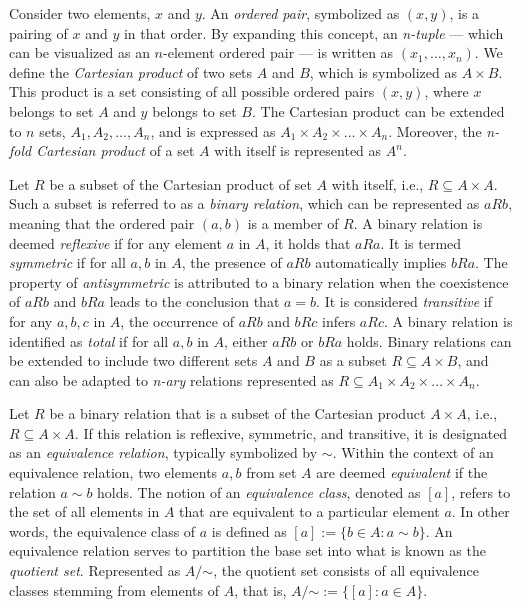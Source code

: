
Consider two elements, $x$ and $y$. An \emph{ordered pair}, symbolized as $(x, y)$, is a pairing of $x$ and $y$ in that order. By expanding this concept, an \emph{n-tuple} — which can be visualized as an $n$-element ordered pair — is written as $(x_1, \ldots, x_n)$. We define the \emph{Cartesian product} of two sets $A$ and $B$, which is symbolized as $A \times B$. This product is a set consisting of all possible ordered pairs $(x, y)$, where $x$ belongs to set $A$ and $y$ belongs to set $B$. The Cartesian product can be extended to $n$ sets, $A_1, A_2, \dots, A_n$, and is expressed as $A_1 \times A_2 \times \dots \times A_n$. Moreover, the \emph{n-fold Cartesian product} of a set $A$ with itself is represented as $A^n$.

Let $R$ be a subset of the Cartesian product of set $A$ with itself, i.e., $R \subseteq A \times A$. Such a subset is referred to as a \emph{binary relation}, which can be represented as $aRb$, meaning that the ordered pair $(a, b)$ is a member of $R$. A binary relation is deemed \emph{reflexive} if for any element $a$ in $A$, it holds that $aRa$. It is termed \emph{symmetric} if for all $a, b$ in $A$, the presence of $aRb$ automatically implies $bRa$. The property of \emph{antisymmetric} is attributed to a binary relation when the coexistence of $aRb$ and $bRa$ leads to the conclusion that $a = b$. It is considered \emph{transitive} if for any $a, b, c$ in $A$, the occurrence of $aRb$ and $bRc$ infers $aRc$. A binary relation is identified as \emph{total} if for all $a, b$ in $A$, either $aRb$ or $bRa$ holds. Binary relations can be extended to include two different sets $A$ and $B$ as a subset $R \subseteq A \times B$, and can also be adapted to \emph{n-ary} relations represented as $R \subseteq A_1 \times A_2 \times \dots \times A_n$.

Let $R$ be a binary relation that is a subset of the Cartesian product $A \times A$, i.e., $R \subseteq A \times A$. If this relation is reflexive, symmetric, and transitive, it is designated as an \emph{equivalence relation}, typically symbolized by $\sim$. Within the context of an equivalence relation, two elements $a, b$ from set $A$ are deemed \emph{equivalent} if the relation $a \sim b$ holds. The notion of an \emph{equivalence class}, denoted as $[a]$, refers to the set of all elements in $A$ that are equivalent to a particular element $a$. In other words, the equivalence class of $a$ is defined as $[a] := \{ b \in A : a \sim b\}$. An equivalence relation serves to partition the base set into what is known as the \emph{quotient set}. Represented as $A / {\mathord {\sim }}$, the quotient set consists of all equivalence classes stemming from elements of $A$, that is, $A / {\mathord {\sim }} := \{ [a] : a \in A \}$.

